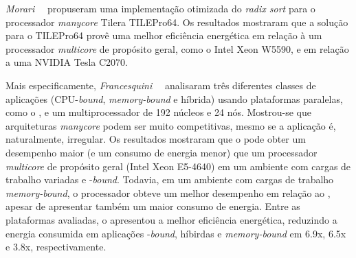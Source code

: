 \emph{Morari}~\etal~\cite{Valero:2012} propuseram uma implementação otimizada do
\textit{radix sort} para o processador \textit{manycore} Tilera TILEPro64. Os
resultados mostraram que a solução para o TILEPro64 provê uma melhor eficiência
energética em relação à um processador \textit{multicore} de propósito geral, como
o Intel Xeon W5590, e em relação a uma \gpu NVIDIA Tesla C2070.

Mais especificamente, \emph{Francesquini}~\etal~\cite{Castro-IA3-JPDC:2014} analisaram
três diferentes classes de aplicações (CPU-\textit{bound}, \textit{memory-bound}
e híbrida) usando plataformas paralelas, como o \mppa, e um multiprocessador \numa de
192 núcleos e 24 nós. Mostrou-se que arquiteturas \textit{manycore} podem ser muito
competitivas, mesmo se a aplicação é, naturalmente, irregular. Os resultados mostraram
que o \mppa pode obter um desempenho maior (e um consumo de energia menor) que um
processador \textit{multicore} de propósito geral (Intel Xeon E5-4640) em um ambiente
com cargas de trabalho variadas e \cpu{}-\textit{bound}. Todavia, em um ambiente com cargas
de trabalho \textit{memory-bound}, o processador \numa obteve um melhor desempenho
em relação ao \mppa, apesar de apresentar também um maior consumo de energia.
Entre as plataformas avaliadas, o \mppa apresentou a melhor eficiência
energética, reduzindo a energia consumida em aplicações \cpu{}-\textit{bound},
híbirdas e \textit{memory-bound} em 6.9x, 6.5x e 3.8x, respectivamente.

